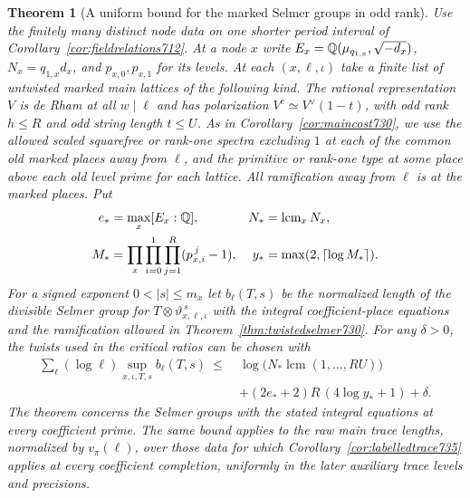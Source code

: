 \documentclass[a4paper,11pt]{article}
\newtheorem{theorem}[proposition]{Theorem}
\theoremstyle{definition}
\theoremstyle{remark}
\numberwithin{equation}{section}
\begin{document}
\begin{theorem}[A uniform bound for the marked Selmer groups in odd rank]
\leavevmode\label{thm:oddselmer739}
Use the finitely many distinct node data on one shorter period
interval of Corollary~\ref{cor:fieldrelations712}. At a node \(x\)
write \(E_x=\mathbb Q(\mu_{q_{1,x}},\sqrt{-d_x})\),
\(N_x=q_{1,x}d_x\), and \(p_{x,0},p_{x,1}\) for its levels.
At each \((x,\ell,\iota)\) take a finite list of untwisted marked
main lattices of the following kind. The rational representation
\(V\) is de Rham at all \(w\mid\ell\) and has polarization
\(V^c\simeq V^\vee(1-t)\), with odd rank \(h\le R\) and odd
string length \(t\le U\). As in Corollary~\ref{cor:maincost730},
we use the allowed scaled squarefree
or rank-one spectra excluding \(1\) at each of the common old
marked places away from \(\ell\), and the primitive or rank-one
type at some place above each old level prime for each lattice.
All ramification away from \(\ell\) is at the marked places. Put
\[
\begin{aligned}
    e_*&=\max_x[E_x:\mathbb Q],&
    N_*&=\operatorname{lcm}_{x}N_x,\\
    M_*&=\prod_x\prod_{i=0}^1\prod_{j=1}^R(p_{x,i}^{\,j}-1),&
    y_*&=\max(2,\lceil\log M_*\rceil).
\end{aligned}
\]
For a signed exponent \(0<|s|\le m_x\) let \(b_\ell(T,s)\)
be the normalized length of the divisible Selmer group for
\(T\otimes\vartheta_{x,\ell,\iota}^{\,s}\) with the integral
coefficient-place equations and the ramification allowed in
Theorem~\ref{thm:twistedselmer730}. For any \(\delta>0\), the
twists used in the critical ratios can be chosen with
\[
\begin{split}
 \sum_{\ell}(\log\ell)
   \sup_{x,\iota,T,s} b_\ell(T,s)
 \ \le\ &\log\!\big(N_*\operatorname{lcm}(1,\ldots,RU)\big)\\
        &+(2e_*+2)R\,(4\log y_*+1)+\delta .
\end{split}
\]
The theorem concerns the Selmer groups with the stated integral
equations at every coefficient prime. The same bound applies to
the raw main trace lengths, normalized by \(v_\pi(\ell)\), over
those data for which Corollary~\ref{cor:labelledtrace735} applies
at every coefficient completion, uniformly in the later auxiliary
trace levels and precisions.
\end{theorem}
\end{document}

